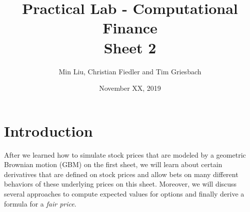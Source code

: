 \documentclass{scrartcl}
\begin{document}
	\title{Practical Lab - Computational Finance \\ Sheet 2}
	\author{Min Liu, Christian Fiedler and Tim Griesbach}
	\date{November XX, 2019}
	\maketitle
	
	\section{Introduction}
	After we learned how to simulate stock prices that are modeled by a geometric Brownian motion (GBM) on the first sheet, we will learn about certain derivatives that are defined on stock prices and allow bets on many different behaviors of these underlying prices on this sheet. Moreover, we will discuss several approaches to compute expected values for options and finally derive a formula for a \textit{fair price}.
	
\end{document}
